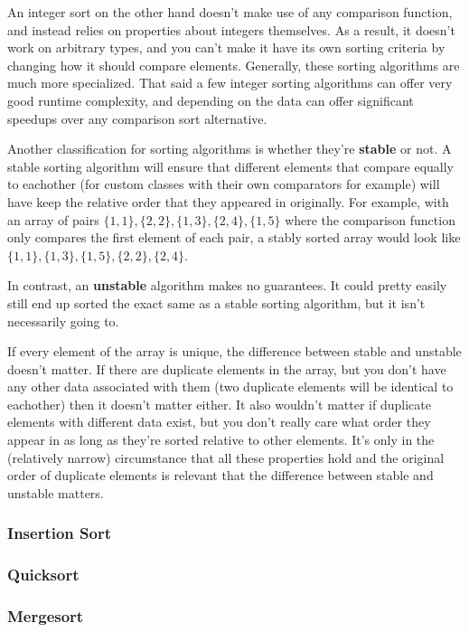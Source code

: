 An integer sort on the other hand doesn't make use of any comparison function, and instead relies on properties about integers themselves. As a result, it doesn't work on arbitrary types, and you can't make it have its own sorting criteria by changing how it should compare elements. Generally, these sorting algorithms are much more specialized. That said a few integer sorting algorithms can offer very good runtime complexity, and depending on the data can offer significant speedups over any comparison sort alternative.

Another classification for sorting algorithms is whether they're \textbf{stable} or not. A stable sorting algorithm will ensure that different elements that compare equally to eachother (for custom classes with their own comparators for example) will have keep the relative order that they appeared in originally. For example, with an array of pairs $\{1,1\}, \{2,2\}, \{1,3\}, \{2,4\}, \{1,5\}$ where the comparison function only compares the first element of each pair, a stably sorted array would look like $\{1,1\}, \{1,3\}, \{1,5\}, \{2,2\}, \{2,4\}$.

In contrast, an \textbf{unstable} algorithm makes no guarantees. It could pretty easily still end up sorted the exact same as a stable sorting algorithm, but it isn't necessarily going to.

If every element of the array is unique, the difference between stable and unstable doesn't matter. If there are duplicate elements in the array, but you don't have any other data associated with them (two duplicate elements will be identical to eachother) then it doesn't matter either. It also wouldn't matter if duplicate elements with different data exist, but you don't really care what order they appear in as long as they're sorted relative to other elements. It's only in the (relatively narrow) circumstance that all these properties hold and the original order of duplicate elements is relevant that the difference between stable and unstable matters.

\subsubsection{Insertion Sort}

\subsubsection{Quicksort}

\subsubsection{Mergesort}

